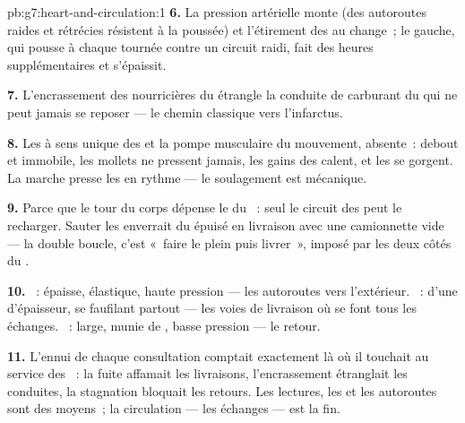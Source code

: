 \begin{solution}{pb:g7:heart-and-circulation:1}
\textbf{6.} La pression artérielle monte (des autoroutes raides et
rétrécies résistent à la poussée) et l'étirement des  au
 change~; le  gauche, qui pousse à chaque tournée
contre un circuit raidi, fait des heures supplémentaires et
s'épaissit.

\textbf{7.} L'encrassement des  nourricières du  étrangle
la conduite de carburant du  qui ne peut jamais se reposer ---
le chemin classique vers l'infarctus.

\textbf{8.} Les  à sens unique des  et la pompe
musculaire du mouvement, absente~: debout et immobile, les mollets
ne pressent jamais, les gains des  calent, et les  se
gorgent. La marche presse les  en rythme --- le soulagement
est mécanique.

\textbf{9.} Parce que le tour du corps dépense le  du
~: seul le circuit des  peut le recharger. Sauter les
 enverrait du  épuisé en livraison avec une camionnette
vide --- la double boucle, c'est «~faire le plein puis livrer~»,
imposé par les deux côtés du .

\textbf{10.} ~: épaisse, élastique, haute pression --- les
autoroutes vers l'extérieur. ~: d'une  d'épaisseur,
se faufilant partout --- les voies de livraison où se font tous les
échanges. ~: large, munie de , basse pression --- le
retour.

\textbf{11.} L'ennui de chaque consultation comptait exactement là
où il touchait au service des ~: la fuite affamait les
livraisons, l'encrassement étranglait les conduites, la stagnation
bloquait les retours. Les lectures, les  et les autoroutes
sont des moyens~; la circulation  --- les échanges --- est
la fin.


\end{solution}
